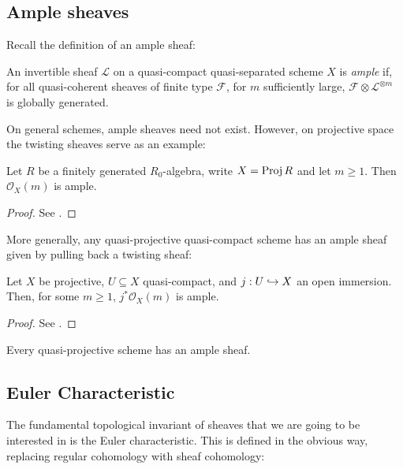 \documentclass[12pt]{ociamthesis}  %
\begin{document}
\subsection{Ample sheaves}

Recall the definition of an ample sheaf:

\begin{definition}
  An invertible sheaf $\mathscr L$ on a quasi-compact quasi-separated
  scheme $X$ is \emph{ample} if, for all quasi-coherent sheaves of
  finite type $\mathscr F$, for $m$ sufficiently large,
  $\mathscr F\otimes \mathscr L^{\otimes m}$ is
  globally generated.
\end{definition}

On general schemes, ample sheaves need not exist. However, on
projective space the twisting sheaves serve as an example:

\begin{proposition}
  Let $R$ be a finitely generated $R_0$-algebra,
  write $X=\operatorname{Proj} R$ and let $m\geq 1$. Then
  $\mathscr O_X(m)$ is ample.
  \begin{proof}
    See \cite[Example 13.45]{gortz2010}.
  \end{proof}
\end{proposition}

More generally, any quasi-projective quasi-compact scheme has
an ample sheaf given by pulling back a twisting sheaf:

\begin{proposition}
  Let $X$ be projective, $U\subseteq X$ quasi-compact, and
  $j : U \hookrightarrow X$ an open immersion. Then, for some $m\geq 1$,
  $j^*\mathscr O_X(m)$ is ample.
  \begin{proof}
    See \cite[\href{https://stacks.math.columbia.edu/tag/01Q2}{Tag 01Q2}]{stacks-project}.
  \end{proof}
\end{proposition}

\begin{corollary}
  Every quasi-projective scheme has an ample sheaf.
\end{corollary}


\subsection{Euler Characteristic}

The fundamental topological invariant of sheaves that we are going
to be interested in is the Euler characteristic. This is defined
in the obvious way, replacing regular cohomology with sheaf
cohomology:
\end{document}
